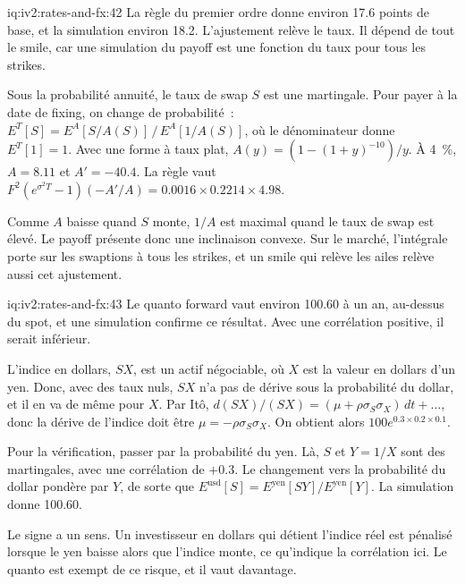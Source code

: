 \begin{solution}{iq:iv2:rates-and-fx:42}
La règle du premier ordre donne environ 17.6 points de base, et la simulation environ 18.2. L'ajustement relève le taux. Il dépend de tout le smile, car une simulation du payoff est une fonction du taux pour tous les strikes.

Sous la probabilité annuité, le taux de swap $S$ est une martingale. Pour payer à la date de fixing, on change de probabilité~: $E^T[S] = E^A[S/A(S)]\,/\,E^A[1/A(S)]$, où le dénominateur donne $E^T[1] = 1$. Avec une forme à taux plat, $A(y) = (1 - (1 + y)^{-10})/y$. À 4~\%, $A = 8.11$ et $A' = -40.4$. La règle vaut $F^2(e^{\sigma^2T} - 1)(-A'/A) = 0.0016 \times 0.2214 \times 4.98$.

Comme $A$ baisse quand $S$ monte, $1/A$ est maximal quand le taux de swap est élevé. Le payoff présente donc une inclinaison convexe. Sur le marché, l'intégrale porte sur les swaptions à tous les strikes, et un smile qui relève les ailes relève aussi cet ajustement.

\end{solution}

\begin{solution}{iq:iv2:rates-and-fx:43}
Le quanto forward vaut environ 100.60 à un an, au-dessus du spot, et une simulation confirme ce résultat. Avec une corrélation positive, il serait inférieur.

L'indice en dollars, $SX$, est un actif négociable, où $X$ est la valeur en dollars d'un yen. Donc, avec des taux nuls, $SX$ n'a pas de dérive sous la probabilité du dollar, et il en va de même pour $X$. Par Itô, $d(SX)/(SX) = (\mu + \rho\sigma_S\sigma_X)\,dt + \ldots$, donc la dérive de l'indice doit être $\mu = -\rho\sigma_S\sigma_X$. On obtient alors $100e^{0.3 \times 0.2 \times 0.1}$.

Pour la vérification, passer par la probabilité du yen. Là, $S$ et $Y = 1/X$ sont des martingales, avec une corrélation de $+0.3$. Le changement vers la probabilité du dollar pondère par $Y$, de sorte que $E^{\text{usd}}[S] = E^{\text{yen}}[SY]/E^{\text{yen}}[Y]$. La simulation donne 100.60.

Le signe a un sens. Un investisseur en dollars qui détient l'indice réel est pénalisé lorsque le yen baisse alors que l'indice monte, ce qu'indique la corrélation ici. Le quanto est exempt de ce risque, et il vaut davantage.

\end{solution}

